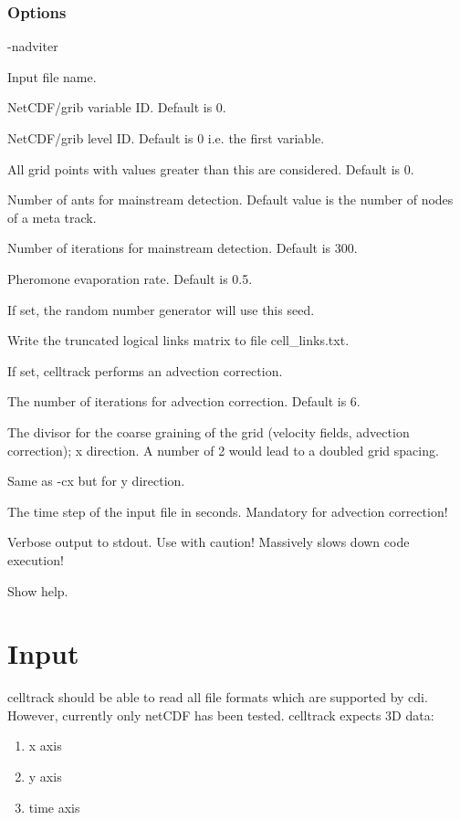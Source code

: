 \documentclass{scrartcl}
\begin{document}
\subsubsection*{Options}
\begin{labeling}{-nadviter }
	\item[-i] Input file name.
	\item[-var] NetCDF/grib variable ID. Default is 0.
	\item[-lev] NetCDF/grib level ID. Default is 0 i.e. the first variable.
	\item[-thres] All grid points with values greater than this are considered. Default is 0.
	\item[-nants] Number of ants for mainstream detection. Default value is the number of nodes of a meta track.
	\item[-nruns] Number of iterations for mainstream detection. Default is 300.
	\item[-rho] Pheromone evaporation rate. Default is 0.5.
	\item[-rseed] If set, the random number generator will use this seed.
    \item[-lout] Write the truncated logical links matrix to file cell\_links.txt.
    \item[-advcor] If set, celltrack performs an advection correction.
    \item[-nadviter] The number of iterations for advection correction. Default is 6.
    \item[-cx] The divisor for the coarse graining of the grid (velocity fields, advection correction); x direction. A number of 2 would lead to a doubled grid spacing. 
    \item[-cy] Same as -cx but for y direction.
    \item[-tstep] The time step of the input file in seconds. Mandatory for advection correction!
	\item[-v] Verbose output to stdout. Use with caution! Massively slows down code execution!
	\item[-h] Show help.
\end{labeling}

\section{Input}
celltrack should be able to read all file formats which are supported by cdi. However, currently only netCDF has been tested.
celltrack expects 3D data:
\begin{enumerate}
	\item x axis
	\item y axis
    \item time axis
\end{enumerate}
\end{document}
